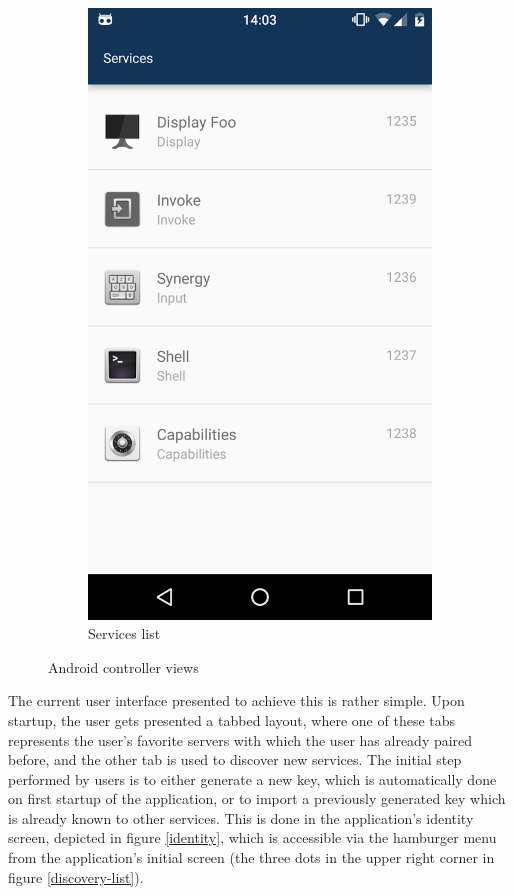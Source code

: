 \begin{figure}
\begin{subfigure}{0.24\textwidth}
        \includegraphics[width=\linewidth]{resources/services-list.png}
        \caption{Services list}
        \label{services-list}
    \end{subfigure}

    \caption{Android controller views}
\end{figure}

The current user interface presented to achieve this is rather simple.
Upon startup, the user gets presented a tabbed layout, where one of these tabs represents the user's favorite servers with which the user has already paired before, and the other tab is used to discover new services.
The initial step performed by users is to either generate a new key, which is automatically done on first startup of the application, or to import a previously generated key which is already known to other services.
This is done in the application's identity screen, depicted in figure \ref{identity}, which is accessible via the hamburger menu from the application's initial screen (the three dots in the upper right corner in figure \ref{discovery-list}).


